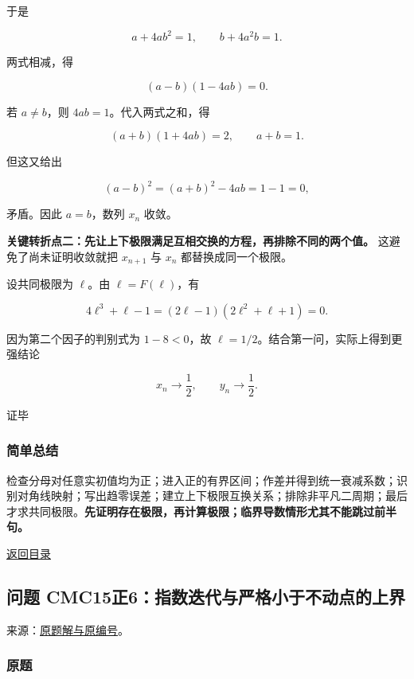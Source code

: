 \documentclass[11pt,a4paper]{article}
\begin{document}
于是

\[
a+4ab^2=1,\qquad b+4a^2b=1.
\]

两式相减，得

\[
(a-b)(1-4ab)=0.
\]

若 \(a\ne b\)，则 \(4ab=1\)。代入两式之和，得

\[
(a+b)(1+4ab)=2,
\qquad a+b=1.
\]

但这又给出

\[
(a-b)^2=(a+b)^2-4ab=1-1=0,
\]

矛盾。因此 \(a=b\)，数列 \(x_n\) 收敛。

\textbf{关键转折点二：先让上下极限满足互相交换的方程，再排除不同的两个值。}
这避免了尚未证明收敛就把 \(x_{n+1}\) 与 \(x_n\) 都替换成同一个极限。

设共同极限为 \(\ell\)。由 \(\ell=F(\ell)\)，有

\[
4\ell^3+\ell-1
=(2\ell-1)(2\ell^2+\ell+1)=0.
\]

因为第二个因子的判别式为 \(1-8<0\)，故
\(\ell=1/2\)。结合第一问，实际上得到更强结论

\[
\boxed{x_n\longrightarrow\frac12,\qquad y_n\longrightarrow\frac12}.
\]

证毕

\subsubsection{简单总结}\label{ux7b80ux5355ux603bux7ed3-19}

检查分母对任意实初值均为正；进入正的有界区间；作差并得到统一衰减系数；识别对角线映射；写出趋零误差；建立上下极限互换关系；排除非平凡二周期；最后才求共同极限。\textbf{先证明存在极限，再计算极限；临界导数情形尤其不能跳过前半句。}

\noindent\hyperref[contents]{返回目录}

\subsection{问题
CMC15正6：指数迭代与严格小于不动点的上界}\label{ux95eeux9898-cmc15ux6b636ux6307ux6570ux8fedux4ee3ux4e0eux4e25ux683cux5c0fux4e8eux4e0dux52a8ux70b9ux7684ux4e0aux754c}

来源：\href{https://zj139.github.io/math-notes/essays/968abeeef5ad2a0653d8210d/\#问题-6}{原题解与原编号}。

\subsubsection{原题}\label{ux539fux9898-20}
\end{document}
